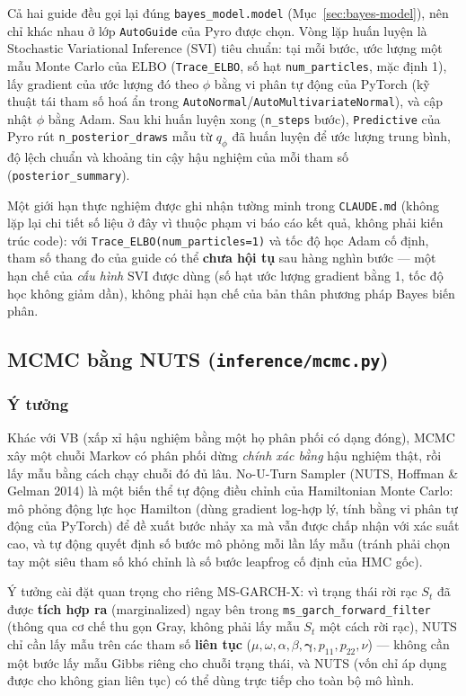 \documentclass[11pt,a4paper]{article}
\newcommand{\code}[1]{\texttt{#1}}
\newcommand{\file}[1]{\texttt{#1}}
\begin{document}
Cả hai guide đều gọi lại đúng \code{bayes\_model.model} (Mục~\ref{sec:bayes-model}),
nên chỉ khác nhau ở lớp \code{AutoGuide} của Pyro được chọn. Vòng lặp huấn luyện là
Stochastic Variational Inference (SVI) tiêu chuẩn: tại mỗi bước, ước lượng một mẫu
Monte Carlo của ELBO (\code{Trace\_ELBO}, số hạt \code{num\_particles}, mặc định 1),
lấy gradient của ước lượng đó theo $\phi$ bằng vi phân tự động của PyTorch (kỹ thuật
tái tham số hoá ẩn trong \code{AutoNormal}/\code{AutoMultivariateNormal}), và cập nhật
$\phi$ bằng Adam. Sau khi huấn luyện xong (\code{n\_steps} bước), \code{Predictive}
của Pyro rút \code{n\_posterior\_draws} mẫu từ $q_\phi$ đã huấn luyện để ước lượng
trung bình, độ lệch chuẩn và khoảng tin cậy hậu nghiệm của mỗi tham số
(\code{posterior\_summary}).

Một giới hạn thực nghiệm được ghi nhận tường minh trong \file{CLAUDE.md} (không lặp
lại chi tiết số liệu ở đây vì thuộc phạm vi báo cáo kết quả, không phải kiến trúc
code): với \code{Trace\_ELBO(num\_particles=1)} và tốc độ học Adam cố định, tham số
thang đo của guide có thể \textbf{chưa hội tụ} sau hàng nghìn bước --- một hạn chế của
\emph{cấu hình} SVI được dùng (số hạt ước lượng gradient bằng 1, tốc độ học không
giảm dần), không phải hạn chế của bản thân phương pháp Bayes biến phân.

\subsection{MCMC bằng NUTS (\file{inference/mcmc.py})}

\subsubsection{Ý tưởng}

Khác với VB (xấp xỉ hậu nghiệm bằng một họ phân phối có dạng đóng), MCMC xây một
chuỗi Markov có phân phối dừng \emph{chính xác bằng} hậu nghiệm thật, rồi lấy mẫu
bằng cách chạy chuỗi đó đủ lâu. No-U-Turn Sampler (NUTS, Hoffman \& Gelman 2014) là
một biến thể tự động điều chỉnh của Hamiltonian Monte Carlo: mô phỏng động lực học
Hamilton (dùng gradient log-hợp lý, tính bằng vi phân tự động của PyTorch) để đề xuất
bước nhảy xa mà vẫn được chấp nhận với xác suất cao, và tự động quyết định số bước mô
phỏng mỗi lần lấy mẫu (tránh phải chọn tay một siêu tham số khó chỉnh là số bước
leapfrog cố định của HMC gốc).

Ý tưởng cài đặt quan trọng cho riêng MS-GARCH-X: vì trạng thái rời rạc $S_t$ đã được
\textbf{tích hợp ra} (marginalized) ngay bên trong \code{ms\_garch\_forward\_filter}
(thông qua cơ chế thu gọn Gray, không phải lấy mẫu $S_t$ một cách rời rạc), NUTS chỉ
cần lấy mẫu trên các tham số \textbf{liên tục} ($\mu,\omega,\alpha,\beta,
\boldsymbol\gamma, p_{11}, p_{22}, \nu$) --- không cần một bước lấy mẫu Gibbs riêng
cho chuỗi trạng thái, và NUTS (vốn chỉ áp dụng được cho không gian liên tục) có thể
dùng trực tiếp cho toàn bộ mô hình.
\end{document}

